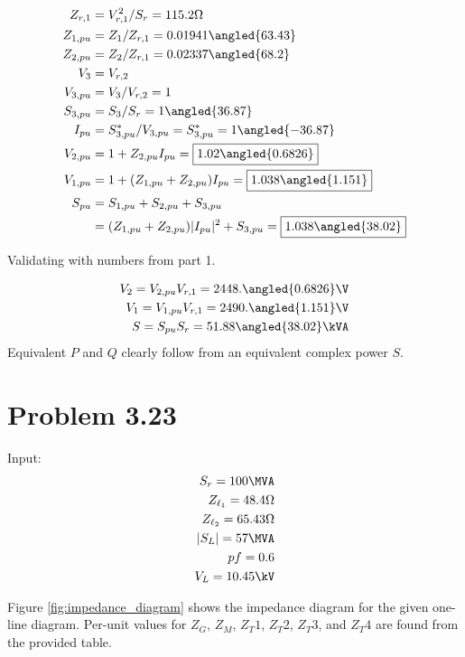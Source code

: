 \documentclass{homework}
\begin{document}
\begin{align*}
    Z_{r,1} &= V_{r,1}^2 / S_r = 115.2 \ohm \\
    Z_{1,pu} &= Z_1 / Z_{r,1} = 0.01941 \angled{63.43} \\
    Z_{2,pu} &= Z_2 / Z_{r,1} = 0.02337 \angled{68.2} \\
    V_3 &= V_{r,2} \\
    V_{3,pu} &= V_3 / V_{r,2} = 1 \\
    S_{3,pu} &= S_3 / S_r = 1 \angled{36.87} \\
    I_{pu} &= S_{3,pu}^* / V_{3,pu} = S_{3,pu}^* = 1 \angled{-36.87} \\
    V_{2,pu} &= 1 + Z_{2,pu} I_{pu} = \boxed{1.02 \angled{0.6826}} \\
    V_{1,pu} &= 1 + (Z_{1,pu} + Z_{2,pu}) I_{pu} = \boxed{1.038 \angled{1.151}} \\
    S_{pu} &= S_{1,pu} + S_{2,pu} + S_{3,pu} \\
        &= (Z_{1,pu} + Z_{2,pu}) |I_{pu}|^2 + S_{3,pu} = \boxed{1.038 \angled{38.02}}
\end{align*}

Validating with numbers from part 1.

\begin{align*}
    V_2 = V_{2,pu} V_{r,1} = 2448. \angled{0.6826} \V \\
    V_1 = V_{1,pu} V_{r,1} = 2490. \angled{1.151} \V \\
    S = S_{pu} S_r = 51.88 \angled{38.02} \kVA
\end{align*}
Equivalent $P$ and $Q$ clearly follow from an equivalent complex power $S$.

\section{Problem 3.23}
Input:
\begin{align*}
    S_r = 100 \MVA \\
    Z_{\ell_1} = 48.4 \ohm \\
    Z_{\ell_2} = 65.43 \ohm \\
    |S_L| = 57 \MVA \\
    pf = 0.6 \\
    V_L = 10.45 \kV 
\end{align*}

Figure \ref{fig:impedance_diagram} shows the impedance diagram for the given
one-line diagram. Per-unit values for $Z_G$, $Z_M$, $Z_T1$, $Z_T2$,
$Z_T3$, and $Z_T4$ are found from the provided table. 
\end{document}

